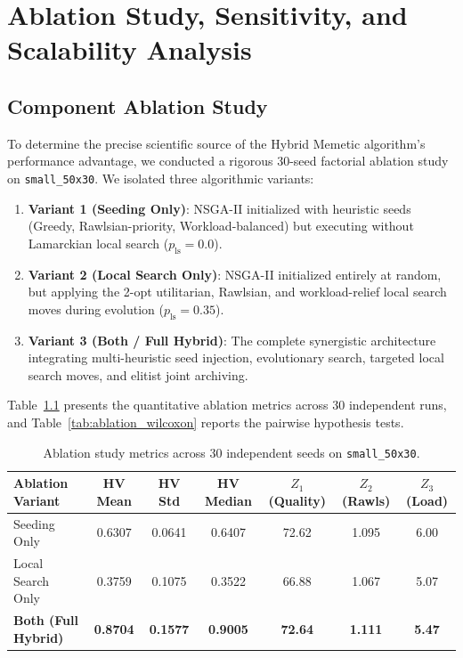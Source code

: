 \chapter{Ablation Study, Sensitivity, and Scalability Analysis}
\label{ch:ablation}

\section{Component Ablation Study}
To determine the precise scientific source of the Hybrid Memetic algorithm's performance advantage, we conducted a rigorous 30-seed factorial ablation study on \texttt{small\_50x30}. We isolated three algorithmic variants:
\begin{enumerate}
    \item \textbf{Variant 1 (Seeding Only)}: NSGA-II initialized with heuristic seeds (Greedy, Rawlsian-priority, Workload-balanced) but executing without Lamarckian local search ($p_{\text{ls}} = 0.0$).
    \item \textbf{Variant 2 (Local Search Only)}: NSGA-II initialized entirely at random, but applying the 2-opt utilitarian, Rawlsian, and workload-relief local search moves during evolution ($p_{\text{ls}} = 0.35$).
    \item \textbf{Variant 3 (Both / Full Hybrid)}: The complete synergistic architecture integrating multi-heuristic seed injection, evolutionary search, targeted local search moves, and elitist joint archiving.
\end{enumerate}

Table~\ref{tab:ablation_results} presents the quantitative ablation metrics across 30 independent runs, and Table~\ref{tab:ablation_wilcoxon} reports the pairwise hypothesis tests.

\begin{table}[htbp]
    \centering
    \caption{Ablation study metrics across 30 independent seeds on \texttt{small\_50x30}.}
    \label{tab:ablation_results}
    \begin{tabularx}{\textwidth}{lcccccc}
        \toprule
        \textbf{Ablation Variant} & \textbf{HV Mean} & \textbf{HV Std} & \textbf{HV Median} & \textbf{$Z_1$ (Quality)} & \textbf{$Z_2$ (Rawls)} & \textbf{$Z_3$ (Load)} \\
        \midrule
        Seeding Only & 0.6307 & 0.0641 & 0.6407 & 72.62 & 1.095 & 6.00 \\
        Local Search Only & 0.3759 & 0.1075 & 0.3522 & 66.88 & 1.067 & 5.07 \\
        \textbf{Both (Full Hybrid)} & \textbf{0.8704} & \textbf{0.1577} & \textbf{0.9005} & \textbf{72.64} & \textbf{1.111} & \textbf{5.47} \\
        \bottomrule
    \end{tabularx}
\end{table}

